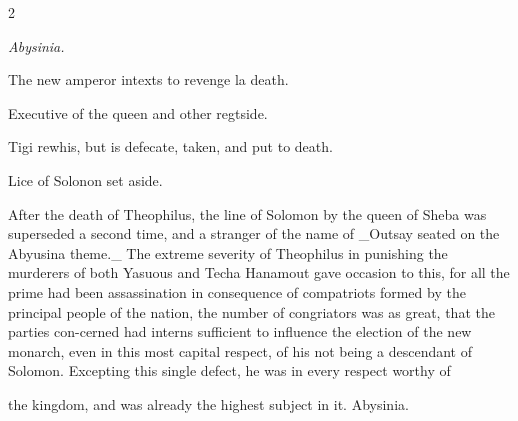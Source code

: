 \documentclass[10pt]{article}
\begin{document}
\begin{multicols}{2}\raggedcolumns
\begin{center}\small\itshape Abysinia.\end{center}
The new amperor intexts to revenge la death.

Executive of the queen and other regtside.

Tigi rewhis, but is defecate, taken, and put to death.

Lice of Solonon set aside.

After the death of Theophilus, the line of Solomon by the queen of Sheba was superseded a second time, and a stranger of the name of \_Outsay seated on the Abyusina theme.\_ The extreme severity of Theophilus in punishing the murderers of both Yasuous and Techa Hanamout gave occasion to this, for all the prime had been assassination in consequence of compatriots formed by the principal people of the nation, the number of congriators was as great, that the parties con-cerned had interns sufficient to influence the election of the new monarch, even in this most capital respect, of his not being a descendant of Solomon. Excepting this single defect, he was in every respect worthy of

the kingdom, and was already the highest subject in it. Abysinia.


\end{multicols}
\end{document}
